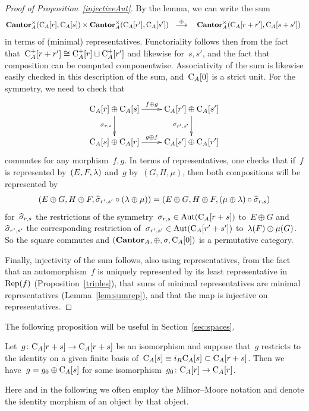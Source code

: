 \begin{proof}[Proof of Proposition~\ref{injectiveAut}]
By the lemma, we can write the sum 
$$ \Can^\x_A(\rmC_A[r],\rmC_A[s]) \x \Can_A^\x(\rmC_A[r'],\rmC_A[s'])  \ \ \stackrel{\oplus}\rar\ \ \ \Can_A^\x(\rmC_A[r+r'],\rmC_A[s+s'])~$$
in terms of (minimal) representatives. 
Functoriality follows then from the fact that~$\mathrm{C}_A^+[r+r']\cong \mathrm{C}_A^+[r]\sqcup \mathrm{C}_A^+[r']$ and likewise for~$s,s'$, and the fact that composition can be computed componentwise. 
Associativity of the sum is likewise easily checked in this description of the sum, and~$\mathrm{C}_A[0]$ is a strict unit. For the symmetry, we need to check that 
$$\xymatrix{\rmC_A[r]\oplus \rmC_A[s] \ar[r]^-{f\oplus g} \ar[d]_{\s_{r,s}} & \rmC_A[r']\oplus \rmC_A[s'] \ar[d]_{\s_{r',s'}} \\
\rmC_A[s]\oplus \rmC_A[r] \ar[r]^-{g\oplus f} & \rmC_A[s']\oplus \rmC_A[r']   }$$
commutes for any morphism~$f,g$. In terms of representatives, one checks that if~$f$ is represented by~$(E,F,\lambda)$ and~$g$ by~$(G,H,\mu)$, then both compositions will be represented by 
$$(E\oplus G,H\oplus F,\widehat {\sigma}_{r',s'}\circ (\lambda\oplus \mu))= (E\oplus G,H\oplus F, (\mu\oplus \lambda)\circ \widehat {\sigma}_{r,s})$$
for~$\widehat {\sigma}_{r,s}$ the restrictions of the symmetry~$\sigma_{r,s}\in\operatorname{Aut}(\mathrm{C}_A[r+s])$ to~$E\oplus G$ and~$\widehat {\sigma}_{r',s'}$ the corresponding restriction of~$\sigma_{r',s'}\in\operatorname{Aut}(\mathrm{C}_A[r'+s'])$ to~$\lambda(F)\oplus \mu(G)$.  So the square commutes and 
$(\mathbf{Cantor}_A,\oplus,\sigma,\mathrm{C}_A[0])$ is a permutative category. 

Finally, injectivity of the sum follows, also using representatives,  from the fact that an automorphism~$f$ is uniquely represented by its least representative in~$\operatorname{Rep}(f)$ (Proposition~\ref{triples}), that sums of minimal representatives are minimal representatives (Lemma~\ref{lem:sumrep}),
and that the map is injective on representatives. 
\end{proof}


The following proposition will be useful in Section~\ref{sec:spaces}. 

\begin{prop}\label{prop:split}
Let~$g\colon\mathrm{C}_A[r+s]\to \mathrm{C}_A[r+s]$ be an isomorphism and suppose that~$g$ restricts to the identity on a given finite basis of~$\mathrm{C}_A[s]\equiv i_R\mathrm{C}_A[s]\subset \mathrm{C}_A[r+s]$. 
Then we have~$g=g_0\oplus \mathrm{C}_A[s]$ for some isomorphism~\hbox{$g_0\colon\mathrm{C}_A[r]\to \mathrm{C}_A[r]$}. 
\end{prop}

Here and in the following we often employ the Milnor--Moore notation and denote the identity morphism of an object by that object.

